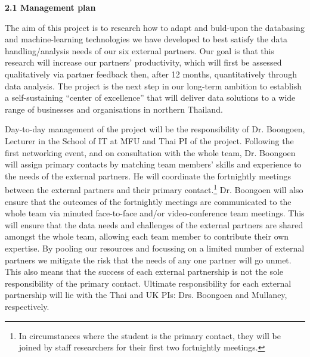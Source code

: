 \documentclass[11pt]{article}
\begin{document}

\vspace{3mm}
\noindent
{\large \bf 2.1 Management plan}

\noindent
The aim of this project is to research how to adapt and buld-upon the databasing and machine-learning technologies we have developed to best satisfy the data handling/analysis needs of our six external partners. Our goal is that this research will increase our partners' productivity, which will first be assessed qualitatively via partner feedback then, after 12 months, quantitatively through data analysis. The project is the next step in our long-term ambition to establish a self-sustaining ``center of excellence'' that will deliver data solutions to a wide range of businesses and organisations in northern Thailand.

\vspace{2mm}
\noindent
Day-to-day management of the project will be the responsibility of Dr. Boongoen, Lecturer in the School of IT at MFU and Thai PI of the project. Following the first networking event, and on consultation with the whole team, Dr. Boongoen will assign primary contacts by matching team members' skills and experience to the needs of the external partners. He will coordinate the fortnightly meetings between the external partners and their primary contact.\footnote{In circumstances where the student is the primary contact, they will be joined by staff researchers for their first two fortnightly meetings.} Dr. Boongoen will also ensure that the outcomes of the fortnightly meetings are communicated to the whole team via minuted face-to-face and/or video-conference team meetings. This will ensure that the data needs and challenges of the external partners are shared amongst the whole team, allowing each team member to contribute their own expertise. By pooling our resources and focussing on a limited number of external partners we mitigate the risk that the needs of any one partner will go unmet. This also means that the success of each external partnership is not the sole responsibility of the primary contact. Ultimate responsibility for each external partnership will lie with the Thai and UK PIs: Drs. Boongoen and Mullaney, respectively. 
\end{document}

